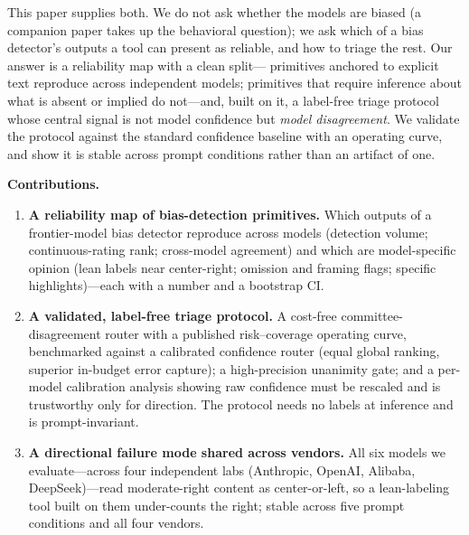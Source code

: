 \documentclass{article}
\begin{document}
This paper supplies both. We do not ask whether the models are biased (a
companion paper takes up the behavioral question); we ask which of a
bias detector's outputs a tool can present as reliable, and how to
triage the rest. Our answer is a reliability map with a clean split---
primitives anchored to explicit text reproduce across independent
models; primitives that require inference about what is absent or
implied do not---and, built on it, a label-free triage protocol whose
central signal is not model confidence but \emph{model disagreement}. We
validate the protocol against the standard confidence baseline with an
operating curve, and show it is stable across prompt conditions rather
than an artifact of one.

\textbf{Contributions.}
\begin{enumerate}
  \item \textbf{A reliability map of bias-detection primitives.} Which
  outputs of a frontier-model bias detector reproduce across models
  (detection volume; continuous-rating rank; cross-model agreement) and
  which are model-specific opinion (lean labels near center-right;
  omission and framing flags; specific highlights)---each with a number
  and a bootstrap CI.
  \item \textbf{A validated, label-free triage protocol.} A cost-free
  committee-disagreement router with a published risk--coverage
  operating curve, benchmarked against a calibrated confidence router
  (equal global ranking, superior in-budget error capture); a
  high-precision unanimity gate; and a per-model calibration analysis
  showing raw confidence must be rescaled and is trustworthy only for
  direction. The protocol needs no labels at inference and is
  prompt-invariant.
  \item \textbf{A directional failure mode shared across vendors.} All
  six models we evaluate---across four independent labs (Anthropic,
  OpenAI, Alibaba, DeepSeek)---read moderate-right content as
  center-or-left, so a lean-labeling tool built on them under-counts the
  right; stable across five prompt conditions and all four vendors.
\end{enumerate}
\end{document}
